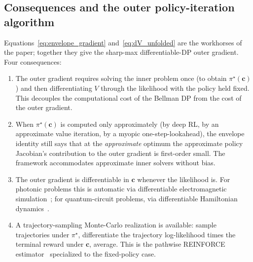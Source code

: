 \documentclass[11pt,a4paper,onecolumn]{article}
\newcommand{\bc}{\bm{c}}
\begin{document}
\subsection{Consequences and the outer policy-iteration algorithm}
\label{sec:envelope_implications}

Equations~\eqref{eq:envelope_gradient} and~\eqref{eq:dV_unfolded} are the workhorses of the paper; together they give the sharp-max differentiable-DP outer gradient.  Four consequences:
\begin{enumerate}[nosep]
\item The outer gradient requires solving the inner problem once (to obtain $\pi^\star(\bc)$) and then differentiating $V$ through the likelihood with the policy held fixed.  This decouples the computational cost of the Bellman DP from the cost of the outer gradient.
\item When $\pi^\star(\bc)$ is computed only approximately (by deep RL, by an approximate value iteration, by a myopic one-step-lookahead), the envelope identity still says that at the \emph{approximate} optimum the approximate policy Jacobian's contribution to the outer gradient is first-order small.  The framework accommodates approximate inner solvers without bias.
\item The outer gradient is differentiable in $\bc$ whenever the likelihood is.  For photonic problems this is automatic via differentiable electromagnetic simulation~\cite{hughes2018adjoint, minkov2020inverse}; for quantum-circuit problems, via differentiable Hamiltonian dynamics~\cite{khaneja2005optimal}.
\item A trajectory-sampling Monte-Carlo realization is available: sample trajectories under $\pi^\star$, differentiate the trajectory log-likelihood times the terminal reward under $\bc$, average.  This is the pathwise REINFORCE estimator~\cite{williams1992reinforce, schulman2015pathwise} specialized to the fixed-policy case.
\end{enumerate}
\end{document}
